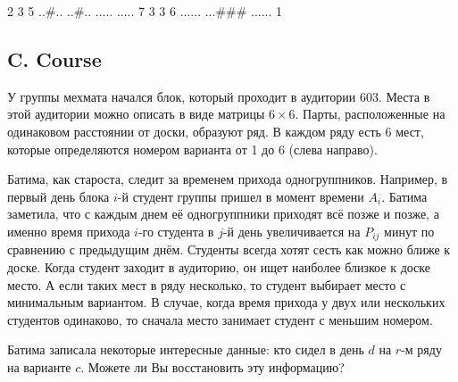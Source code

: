 
\examplee
{2 3  5 \newline
..\#.. \newline
..\#.. \newline
..... \newline
.....}
{7}
{3 3  6 \newline
...... \newline
...\#\#\# \newline
......}
{1}



\subsection*{C. Course}


У группы мехмата начался блок, который проходит в аудитории $603$. Места в этой аудитории можно описать в виде матрицы $6 \times 6$. Парты, расположенные на одинаковом расстоянии от доски, образуют ряд. В каждом ряду есть 6 мест, которые определяются номером варианта от 1 до 6 (слева направо).

Батима, как староста, следит за временем прихода одногруппников. Например, в первый день блока $i$-й студент группы пришел в момент времени $A_i$. Батима заметила, что с каждым днем её одногруппники приходят всё позже и позже, а именно время прихода $i$-го студента в $j$-й день увеличивается на $P_{ij}$ минут по сравнению с предыдущим днём. Студенты всегда хотят сесть как можно ближе к доске. Когда студент заходит в аудиторию, он ищет наиболее близкое к доске место. А если таких мест в ряду несколько, то студент выбирает место с минимальным вариантом. В случае, когда время прихода у двух или нескольких студентов одинаково, то сначала место занимает студент с меньшим номером. 

Батима записала некоторые интересные данные: кто сидел в день $d$ на $r$-м ряду на варианте $c$. Можете ли Вы восстановить эту информацию?


